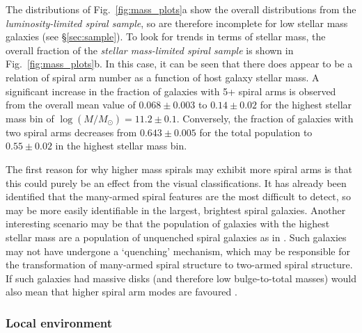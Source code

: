\documentclass[useAMS,usenatbib]{mn2e}
\begin{document}
The distributions of Fig.~\ref{fig:mass_plots}a show the overall distributions from the \textit{luminosity-limited spiral sample}, so are therefore incomplete for low stellar mass galaxies (see \S\ref{sec:sample}). To look for trends in terms of stellar mass, the overall fraction of the \textit{stellar mass-limited spiral sample} is shown in Fig.~\ref{fig:mass_plots}b. In this case, it can be seen that there does appear to be a relation of spiral arm number as a function of host galaxy stellar mass. A significant increase in the fraction of galaxies with 5+ spiral arms is observed from the overall mean value of $0.068 \pm 0.003$ to $0.14 \pm 0.02$ for the highest stellar mass bin of $\log(M/M_{\odot}) = 11.2 \pm 0.1$. Conversely, the fraction of galaxies with two spiral arms decreases from $0.643 \pm 0.005$ for the total population to $0.55 \pm 0.02$ in the highest stellar mass bin. 

The first reason for why higher mass spirals may exhibit more spiral arms is that this could purely be an effect from the visual classifications. It has already been  identified that the many-armed spiral features are the most difficult to detect, so  may be more easily identifiable in the largest, brightest spiral galaxies. Another interesting scenario may be that the population of galaxies with the highest stellar mass are a population of unquenched spiral galaxies as in \citet{Ogle_16}. Such galaxies may not have undergone a `quenching' mechanism, which may be responsible for the transformation of many-armed spiral structure to two-armed spiral structure. If such galaxies had massive disks (and therefore low bulge-to-total masses) would also mean that higher spiral arm modes are favoured \citep{Donghia_15}.
\subsubsection{Local environment}
\label{sec:environment}
\end{document}
